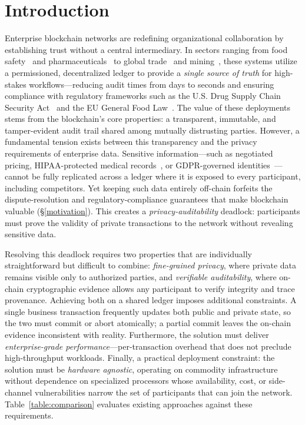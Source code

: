 \section{Introduction}
Enterprise blockchain networks are redefining organizational collaboration by establishing trust without a central intermediary. In sectors ranging from food safety~\cite{7-to-2, walmart-hf} and pharmaceuticals~\cite{mediledger-fda, mediledger-hf} to global trade~\cite{gsbn} and mining~\cite{minehub}, these systems utilize a permissioned, decentralized ledger to provide a \textit{single source of truth} for high-stakes workflows---reducing audit times from days to seconds and ensuring compliance with regulatory frameworks such as the U.S. Drug Supply Chain Security Act~\cite{dscsa} and the EU General Food Law~\cite{eu-gfl}.
The value of these deployments stems from the blockchain's core properties: a transparent, immutable, and tamper-evident audit trail shared among mutually distrusting parties.
However, a fundamental tension exists between this transparency and the privacy requirements of enterprise data. Sensitive information---such as negotiated pricing, HIPAA-protected medical records~\cite{hipaa-privacy}, or GDPR-governed identities~\cite{gdpr}---cannot be fully replicated across a ledger where it is exposed to every participant, including competitors. Yet keeping such data entirely off-chain forfeits the dispute-resolution and regulatory-compliance guarantees that make blockchain valuable (\S\ref{motivation}). This creates a \textit{privacy-auditability} deadlock: participants must prove the validity of private transactions to the network without revealing sensitive data.

Resolving this deadlock requires two properties that are individually straightforward but difficult to combine: \textit{fine-grained privacy}, where private data remains visible only to authorized parties, and \textit{verifiable auditability}, where on-chain cryptographic evidence allows any participant to verify integrity and trace provenance. Achieving both on a shared ledger imposes additional constraints. A single business transaction frequently updates both public and private state, so the two must commit or abort atomically; a partial commit leaves the on-chain evidence inconsistent with reality. Furthermore, the solution must deliver \textit{enterprise-grade performance}---per-transaction overhead that does not preclude high-throughput workloads. Finally, a practical deployment constraint: the solution must be \textit{hardware agnostic}, operating on commodity infrastructure without dependence on specialized processors whose availability, cost, or side-channel vulnerabilities narrow the set of participants that can join the network. Table~\ref{table:comparison} evaluates existing approaches against these requirements.

